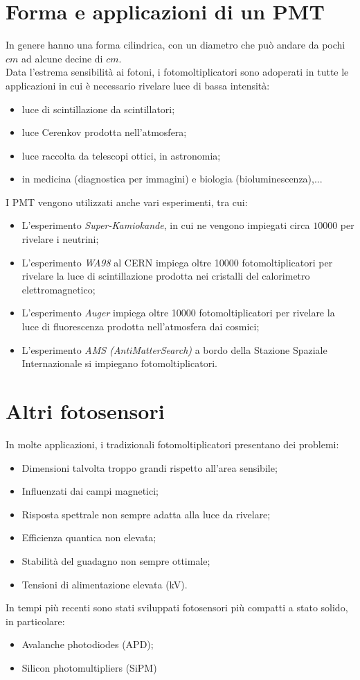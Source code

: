 \documentclass[12pt, letterpaper]{book}
\begin{document}
\section{Forma e applicazioni di un PMT}
In genere hanno una forma cilindrica, con un diametro che può andare da pochi $cm$ ad alcune decine di $cm$.\\
Data l’estrema sensibilità ai fotoni, i fotomoltiplicatori sono adoperati in tutte le applicazioni in cui è necessario rivelare luce di bassa intensità:
\begin{itemize}
    \item luce di scintillazione da scintillatori;
    \item luce Cerenkov prodotta nell’atmosfera;
    \item luce raccolta da telescopi ottici, in astronomia;
    \item in medicina (diagnostica per immagini) e biologia (bioluminescenza),...
\end{itemize}
I PMT vengono utilizzati anche vari esperimenti, tra cui:
\begin{itemize}
    \item L'esperimento \textit{Super-Kamiokande}, in cui ne vengono impiegati circa $10000$ per rivelare i neutrini;
    \item L’esperimento \textit{WA98} al CERN impiega oltre 10000 fotomoltiplicatori per rivelare la luce di scintillazione prodotta nei cristalli del calorimetro elettromagnetico;
    \item L’esperimento \textit{Auger} impiega oltre 10000 fotomoltiplicatori per rivelare la luce di fluorescenza prodotta nell’atmosfera dai cosmici;
    \item L’esperimento \textit{AMS (AntiMatterSearch)} a bordo della Stazione Spaziale Internazionale si impiegano fotomoltiplicatori.
\end{itemize}

\section{Altri fotosensori}
In molte applicazioni, i tradizionali fotomoltiplicatori presentano dei problemi:
\begin{itemize}
    \item Dimensioni talvolta troppo grandi rispetto all’area sensibile;
    \item Influenzati dai campi magnetici;
    \item Risposta spettrale non sempre adatta alla luce da rivelare;
    \item Efficienza quantica non elevata;
    \item Stabilità del guadagno non sempre ottimale;
    \item Tensioni di alimentazione elevata (kV).
\end{itemize}
In tempi più recenti sono stati sviluppati fotosensori più compatti a stato solido, in 
particolare:
\begin{itemize}
    \item Avalanche photodiodes (APD);
    \item Silicon photomultipliers (SiPM)
\end{itemize}
\end{document}

